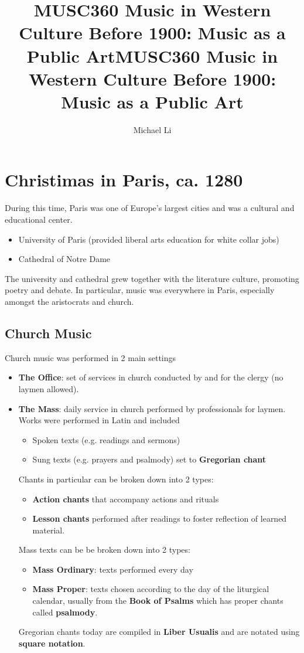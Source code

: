 \documentclass{article}
\date{}
\title{MUSC360 Music in Western Culture Before 1900: Music as a Public Art}
\begin{document}
  \author{Michael Li}
  \title{MUSC360 Music in Western Culture Before 1900: Music as a Public Art}
  \maketitle
  \tableofcontents
  \newpage
  \section{Christimas in Paris, ca. 1280}
  During this time, Paris was one of Europe's largest cities and was a cultural and educational center.
  \begin{itemize}
    \item University of Paris (provided liberal arts education for white collar jobs)
    \item Cathedral of Notre Dame
  \end{itemize}
  The university and cathedral grew together with the literature culture, promoting poetry and debate. In particular, music was everywhere in Paris, especially amongst the aristocrats and church.
  \subsection{Church Music}
  Church music was performed in 2 main settings
  \begin{itemize}
    \item \textbf{The Office}: set of services in church conducted by and for the clergy (no laymen allowed).
    \item \textbf{The Mass}: daily service in church performed by professionals for laymen. Works were performed in Latin and included
      \begin{itemize}
        \item Spoken texts (e.g. readings and sermons)
        \item Sung texts (e.g. prayers and psalmody) set to \textbf{Gregorian chant}
      \end{itemize}
      Chants in particular can be broken down into 2 types:
      \begin{itemize}
        \item \textbf{Action chants} that accompany actions and rituals
        \item \textbf{Lesson chants} performed after readings to foster reflection of learned material.
      \end{itemize}
      Mass texts can be be broken down into 2 types:
      \begin{itemize}
        \item \textbf{Mass Ordinary}: texts performed every day
        \item \textbf{Mass Proper}: texts chosen according to the day of the liturgical calendar, usually from the \textbf{Book of Psalms} which has proper chants called \textbf{psalmody}.
      \end{itemize}
      Gregorian chants today are compiled in \textbf{Liber Usualis} and are notated using \textbf{square notation}.
  \end{itemize}
\end{document}
